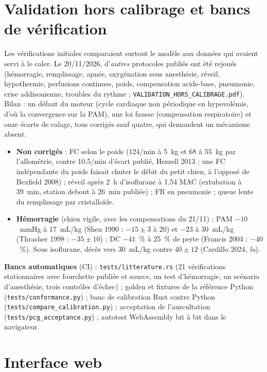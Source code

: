 \documentclass[10pt,a4paper]{article}
\newcommand{\cmd}[1]{\texttt{#1}}
\newcommand{\acc}[1]{\textsl{#1}}
\begin{document}
\section{Validation hors calibrage et bancs de vérification}\label{sec:validation}

Les vérifications initiales comparaient surtout le modèle aux données qui avaient servi à le caler. Le 20/11/2026, d'\emph{autres} protocoles publiés ont été rejoués (hémorragie, remplissage, apnée, oxygénation sous anesthésie, réveil, hypothermie, perfusions continues, poids, compensation acide-base, pneumonie, crise addisonienne, troubles du rythme ; \cmd{VALIDATION\_HORS\_CALIBRAGE.pdf}). Bilan : un défaut du moteur (cycle cardiaque non périodique en hypovolémie, d'où la convergence sur la PAM), une loi fausse (compensation respiratoire) et onze écarts de calage, tous corrigés sauf quatre, qui demandent un mécanisme absent.
\begin{itemize}
\item \textbf{Non corrigés} : FC selon le poids (124/min à 5~kg et 68 à 55~kg par l'allométrie, contre 10,5/min d'écart publié, Hezzell 2013 ; une FC indépendante du poids faisait chuter le débit du petit chien, à l'opposé de Bexfield 2008) ; réveil après 2~h d'isoflurane à 1,54 MAC (extubation à 39~min, station debout à 26~min publiée) ; FR en pneumonie ; queue lente du remplissage par cristalloïde.
\item \textbf{Hémorragie} (chien vigile, avec les compensations du 21/11) : PAM $-10$~mmHg à 17~mL/kg (Shen 1990 : $-15 \pm 3$ à 20) et $-23$ à 30~mL/kg (Thrasher 1998 : $-35 \pm 10$) ; DC $-41$~\% à 25~\% de perte (Francis 2004 : $-40$~\%). Sous isoflurane, décès vers 30~mL/kg contre $40 \pm 12$ (Cardillo 2024, \acc{lu}).
\end{itemize}
\textbf{Bancs automatiques} (CI) : \cmd{tests/litterature.rs} (21 vérifications stationnaires avec fourchette publiée et source, un test d'hémorragie, un scénario d'anesthésie, trois contrôles d'échec) ; golden et fixtures de la référence Python (\cmd{tests/conformance.py}) ; banc de calibration Rust contre Python (\cmd{tests/compare\_calibration.py}) ; acceptation de l'auscultation (\cmd{tests/pcg\_acceptance.py}) ; autotest WebAssembly bit à bit dans le navigateur.

\section{Interface web}\label{sec:web}
\end{document}
